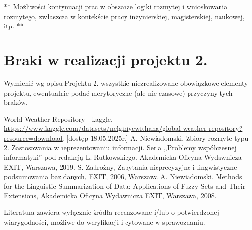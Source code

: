 \documentclass{article}
\begin{document}
** Możliwości kontynuacji prac w obszarze logiki rozmytej i wnioskowania rozmytego, zwłaszcza w kontekście pracy inżynierskiej,
magisterskiej, naukowej, itp. **\\



\section{Braki w realizacji projektu 2.}
Wymienić wg opisu Projektu 2. wszystkie niezrealizowane obowiązkowe elementy projektu, ewentualnie
podać merytoryczne (ale nie czasowe) przyczyny tych braków. 


\begin{thebibliography}{99}
 World Weather Repository - kaggle, \url{https://www.kaggle.com/datasets/nelgiriyewithana/global-weather-repository?resource=download}. [dostęp 18.05.2025r.]
  A. Niewiadomski, Zbiory rozmyte typu 2. Zastosowania w reprezentowaniu informacji.  Seria „Problemy współczesnej informatyki” pod redakcją L. Rutkowskiego. Akademicka Oficyna Wydawnicza EXIT, Warszawa, 2019.
 S. Zadrożny, Zapytania nieprecyzyjne i lingwistyczne podsumowania baz danych, EXIT, 2006, Warszawa
 A. Niewiadomski, Methods for the Linguistic Summarization of Data: Applications of Fuzzy Sets and Their Extensions, Akademicka Oficyna Wydawnicza EXIT, Warszawa, 2008.
\end{thebibliography}

Literatura zawiera wyłącznie źródła recenzowane i/lub o potwierdzonej wiarygodności,
możliwe do weryfikacji i cytowane w sprawozdaniu. 
\end{document}
